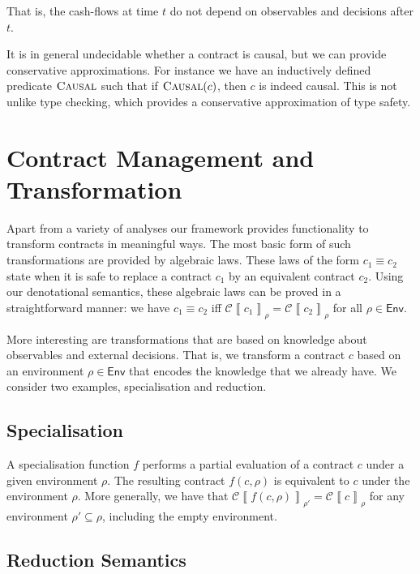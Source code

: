 \documentclass[a4paper,debug,twocolumn]{easychair}
\newcommand\type[1]{\mathsf{#1}}
\newcommand\cSem[2]{{\mathcal C}\left\llbracket#1\right\rrbracket_{#2}}
\newcommand\Pred[1]{\textsc{#1}}
\theoremstyle{plain}
\begin{document}
That is, the cash-flows at time $t$ do not depend on observables and
decisions after $t$.

It is in general undecidable whether a contract is causal, but we
can provide conservative approximations.  For instance we have an
inductively defined predicate $\Pred{Causal}$ such that if
$\Pred{Causal}(c)$, then $c$ is indeed causal. This is not unlike type
checking, which provides a conservative approximation of type safety.


\section{Contract Management and Transformation}
\label{sec:contract-management}

Apart from a variety of analyses our framework provides functionality
to transform contracts in meaningful ways. The most basic form of such
transformations are provided by algebraic laws. These laws of the form
$c_1 \equiv c_2$ state when it is safe to replace a contract $c_1$ by
an equivalent contract $c_2$. Using our denotational semantics, these
algebraic laws can be proved in a straightforward manner: we have $c_1
\equiv c_2$ iff $\cSem{c_1}\rho = \cSem{c_2}\rho$ for all $\rho \in
\type{Env}$.

More interesting are transformations that are based on knowledge about
observables and external decisions. That is, we transform a contract
$c$ based on an environment $\rho \in \type{Env}$ that encodes the
knowledge that we already have. We consider two examples,
specialisation and reduction.

\subsection{Specialisation}
\label{sec:specialisation}

A specialisation function $f$ performs a partial evaluation of a
contract $c$ under a given environment $\rho$. The resulting contract
$f(c,\rho)$ is equivalent to $c$ under the environment $\rho$. More
generally, we have that $\cSem{f(c,\rho)}{\rho'} = \cSem c \rho$ for
any environment $\rho' \subseteq \rho$, including the empty
environment.



\subsection{Reduction Semantics}
\label{sec:reduction-semantics}
\end{document}
